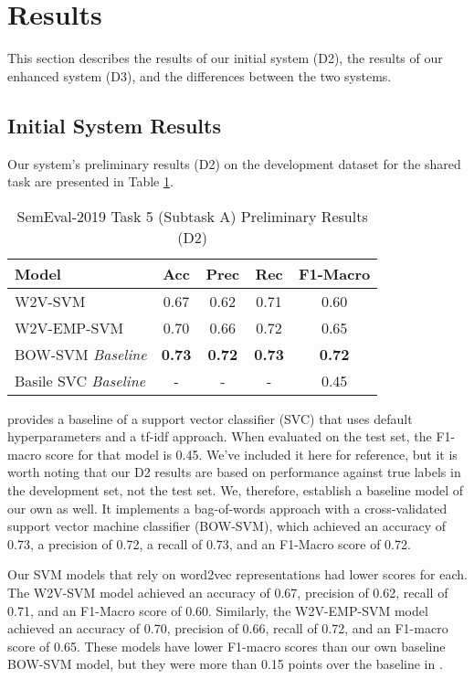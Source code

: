 \documentclass[11pt,a4paper]{article}
\begin{document}
\section{Results}
This section describes the results of our initial system (D2), the results of our enhanced system (D3), and the differences between the two systems.


\subsection{Initial System Results}
Our system's preliminary results (D2) on the development dataset for the shared task are presented in Table \ref{tab:results}.


\begin{table}[h]
\centering
\caption{SemEval-2019 Task 5 (Subtask A) Preliminary Results (D2)}
\label{tab:results}
\footnotesize
\begin{tabular}{lcccc}
\hline
Model & Acc & Prec & Rec & F1-Macro \\ \hline
\textsc{W2V-SVM} & 0.67 & 0.62 & 0.71 & 0.60 \\
\textsc{W2V-EMP-SVM} & 0.70 & 0.66 & 0.72 & 0.65 \\
\textsc{BOW-SVM} \textit{Baseline} & \textbf{0.73} & \textbf{0.72} & \textbf{0.73} & \textbf{0.72} \\
Basile SVC \textit{Baseline} & - & - & - & 0.45 \\ \hline
\end{tabular}
\end{table}

\citet{basile-etal-2019-semeval} provides a baseline of a support vector classifier (SVC) that uses default hyperparameters and a tf-idf approach. When evaluated on the test set, the F1-macro score for that model is 0.45. We’ve included it here for reference, but it is worth noting that our D2 results are based on performance against true labels in the development set, not the test set. We, therefore, establish a baseline model of our own as well. It implements a bag-of-words approach with a cross-validated support vector machine classifier (\textsc{BOW-SVM}), which achieved an accuracy of 0.73, a precision of 0.72, a recall of 0.73, and an F1-Macro score of 0.72.

Our SVM models that rely on word2vec representations had lower scores for each. The \textsc{W2V-SVM} model achieved an accuracy of 0.67, precision of 0.62, recall of 0.71, and an F1-Macro score of 0.60. Similarly, the \textsc{W2V-EMP-SVM} model achieved an accuracy of 0.70, precision of 0.66, recall of 0.72, and an F1-macro score of 0.65. These models have lower F1-macro scores than our own baseline \textsc{BOW-SVM} model, but they were more than 0.15 points over the baseline in \citet{basile-etal-2019-semeval}.
\end{document}

